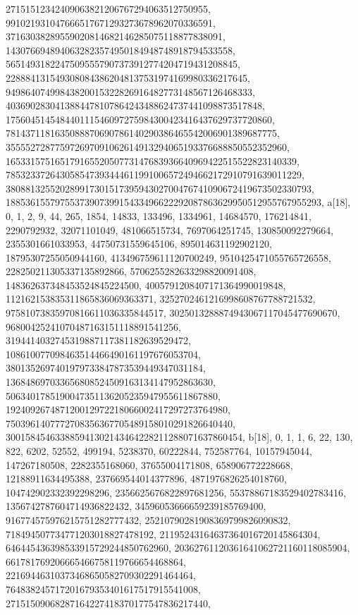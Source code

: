 {{{   27151512342409063821206767294063512750955, 
   991021931047666517671293273678962070336591, 
   37163038289559020814682146285075118877838091, 
   1430766948940632823574950184948748918794533558, 
   56514931822475095557907373912774204719431208845, 
   2288841315493080843862048137531974169980336217645, 
   94986407499843820015322826916482773148567126468333, 
   4036902830413884478107864243488624737441098873517848, 
   175604514548440111546097275984300423416437629737720860, 
   7814371181635088870690786140290386465542006901389687775, 
   355552728775972697091062614913294065193376688850552352960, 
   16533157516517916552050773147683936640969422515522823140339, 
   785323372643058547393444611991006572494662172910791639011229, 
   38088132552028991730151739594302700476741090672419673502330793, 
   1885361557975537390739915433496622292087863629950512955767955293}}, 
 {a[18], {0, 1, 2, 9, 44, 265, 1854, 14833, 133496, 1334961, 14684570, 
   176214841, 2290792932, 32071101049, 481066515734, 7697064251745, 
   130850092279664, 2355301661033953, 44750731559645106, 895014631192902120, 
   18795307255050944160, 413496759611120700249, 9510425471055765726558, 
   228250211305337135892866, 5706255282633298820091408, 
   148362637348453524845224500, 4005791208407171364990019848, 
   112162153835311865836069363371, 3252702461216998608767788721532, 
   97581073835970816611036335844517, 3025013288874943067117045477690670, 
   96800425241070487163151118891541256, 
   3194414032745319887117381182639529472, 
   108610077098463514466490161197676053704, 
   3801352697401979733847873539449347031184, 
   136848697033656808524509163134147952863630, 
   5063401785190047351136205235947955611867880, 
   192409267487120012972218066002417297273764980, 
   7503961407772708356367705489158010291826640440, 
   300158454633885941302143464228211288071637860454}}, 
 {b[18], {0, 1, 1, 6, 22, 130, 822, 6202, 52552, 499194, 5238370, 60222844, 
   752587764, 10157945044, 147267180508, 2282355168060, 37655004171808, 
   658906772228668, 12188911634495388, 237669544014377896, 
   4871976826254018760, 104742902332392298296, 2356625676822897681256, 
   55378867183529402783416, 1356742787604714936822432, 
   34596053666659239185769400, 916774575976215751282777432, 
   25210790281908369799826090832, 718494507734771203018827478192, 
   21195243164637364016720145864304, 646445436398533915729244850762960, 
   20362761120361641062721160118085904, 661781769206665466758119766654468864, 
   22169446310373468650582709302291464464, 
   764838245717201679353401617517915541008, 
   27151509068287164227418370177547836217440, 
}}}
